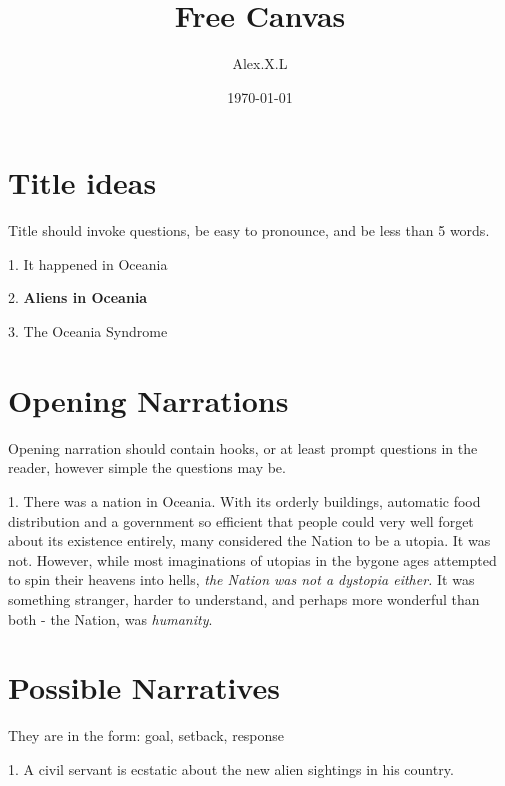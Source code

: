\documentclass[11pt]{article}
\begin{document}
\begin{titlepage}
\title{Free Canvas}
\author{Alex.X.L}
\date{\today} %
\maketitle
\thispagestyle{empty} %
\end{titlepage}



\tableofcontents
\newpage %






\section{Title ideas}
Title should invoke questions, be easy to pronounce, and be less than 5 words. 

1. It happened in Oceania

2. \textbf{Aliens in Oceania}

3. The Oceania Syndrome

\section{Opening Narrations}
Opening narration should contain hooks, or at least prompt questions in the reader, however simple the questions may be.

1. There was a nation in Oceania. With its orderly buildings, automatic food distribution and a government so efficient that people could very well forget about its existence entirely, many considered the Nation to be a utopia. It was not. However, while most imaginations of utopias in the bygone ages attempted to spin their heavens into hells, \textit{the Nation was not a dystopia either.} It was something stranger, harder to understand, and perhaps more wonderful than both - the Nation, was \textit{humanity}. 


\section{Possible Narratives}
They are in the form: goal, setback, response

1. A civil servant is ecstatic about the new alien sightings in his country. 
\end{document}
